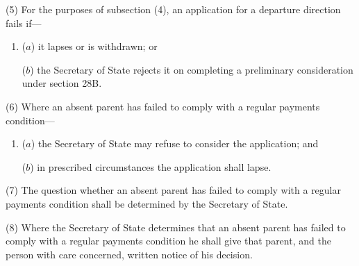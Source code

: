 \documentclass[12pt,a4paper]{article}
\begin{document}
{(5)
For the purposes of subsection (4), an application for a departure direction fails if---
\begin{enumerate}\item[]
($a$) it lapses or is withdrawn; or

($b$) the Secretary of State rejects it on completing a preliminary consideration under section 28B.
\end{enumerate}

(6) Where an absent parent has failed to comply with a regular payments condition---
\begin{enumerate}\item[]
($a$) the Secretary of State may refuse to consider the application; and

($b$) in prescribed circumstances the application shall lapse.
\end{enumerate}

(7)
The question whether an absent parent has failed to comply with a regular payments condition shall be determined by the Secretary of State.

(8)
Where the Secretary of State determines that an absent parent has failed to comply with a regular payments condition he shall give that parent, and the person with care concerned, written notice of his decision.


}
\end{document}
